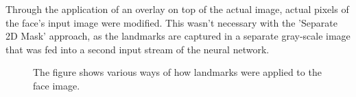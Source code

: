 \noindent Through the application of an overlay on top of the actual image, actual pixels of the face's input image were modified. This wasn't necessary with the 'Separate 2D Mask' approach, as the landmarks are captured in a separate gray-scale image that was fed into a second input stream of the neural network.

\begin{figure}[htbp]
  \begin{center}
  \hfill
  \hfill
  \hfill
  \caption[Ablation study: Landmark visualizations]{The figure shows various ways of how landmarks were applied to the face image.}
  \label{fig:LandmarksImages}
  \end{center}
\end{figure}

